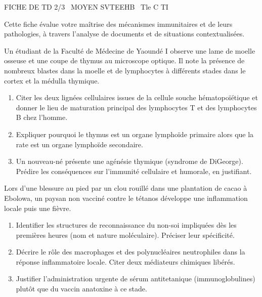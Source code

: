 \documentclass[11pt]{article}
\begin{document}
\begin{tcolorbox}[enhanced,colback=popink,colframe=popink,arc=10pt,boxrule=0pt,left=12pt,right=12pt,top=9pt,bottom=9pt]
{\color{white}\popxbold\small FICHE DE TD 2/3 \textbullet\ MOYEN \hfill SVTEEHB \textbullet\ Tle C TI\par}
\end{tcolorbox}
\vspace{4pt}
Cette fiche évalue votre maîtrise des mécanismes immunitaires et de leurs pathologies, à travers l'analyse de documents et de situations contextualisées.

\begin{exercice}
Un étudiant de la Faculté de Médecine de Yaoundé I observe une lame de moelle osseuse et une coupe de thymus au microscope optique. Il note la présence de nombreux blastes dans la moelle et de lymphocytes à différents stades dans le cortex et la médulla thymique.
\begin{enumerate}
    \item Citer les deux lignées cellulaires issues de la cellule souche hématopoïétique et donner le lieu de maturation principal des lymphocytes T et des lymphocytes B chez l'homme.
    \item Expliquer pourquoi le thymus est un organe lymphoïde primaire alors que la rate est un organe lymphoïde secondaire.
    \item Un nouveau-né présente une agénésie thymique (syndrome de DiGeorge). Prédire les conséquences sur l'immunité cellulaire et humorale, en justifiant.
\end{enumerate}
\end{exercice}

\begin{exercice}
Lors d'une blessure au pied par un clou rouillé dans une plantation de cacao à Ebolowa, un paysan non vacciné contre le tétanos développe une inflammation locale puis une fièvre.
\begin{enumerate}
    \item Identifier les structures de reconnaissance du non-soi impliquées dès les premières heures (nom et nature moléculaire). Préciser leur spécificité.
    \item Décrire le rôle des macrophages et des polynucléaires neutrophiles dans la réponse inflammatoire locale. Citer deux médiateurs chimiques libérés.
    \item Justifier l'administration urgente de sérum antitetanique (immunoglobulines) plutôt que du vaccin anatoxine à ce stade.
\end{enumerate}
\end{exercice}
\end{document}
